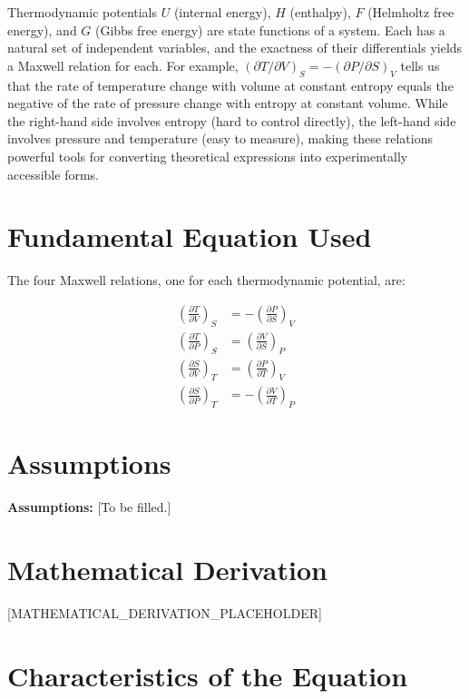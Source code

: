 \documentclass[11pt,openright]{book}
\begin{document}
Thermodynamic potentials $U$ (internal energy), $H$ (enthalpy), $F$ (Helmholtz free energy), and $G$ (Gibbs free energy) are state functions of a system. Each has a natural set of independent variables, and the exactness of their differentials yields a Maxwell relation for each. For example, $(\partial T/\partial V)_{S} = -(\partial P/\partial S)_{V}$ tells us that the rate of temperature change with volume at constant entropy equals the negative of the rate of pressure change with entropy at constant volume. While the right-hand side involves entropy (hard to control directly), the left-hand side involves pressure and temperature (easy to measure), making these relations powerful tools for converting theoretical expressions into experimentally accessible forms.
\section*{Fundamental Equation Used}

The four Maxwell relations, one for each thermodynamic potential, are:

\begin{align}
\left(\frac{\partial T}{\partial V}\right)_{S} &= -\left(\frac{\partial P}{\partial S}\right)_{V}
\label{eq:maxwell1} \\
\left(\frac{\partial T}{\partial P}\right)_{S} &= \left(\frac{\partial V}{\partial S}\right)_{P}
\label{eq:maxwell2} \\
\left(\frac{\partial S}{\partial V}\right)_{T} &= \left(\frac{\partial P}{\partial T}\right)_{V}
\label{eq:maxwell3} \\
\left(\frac{\partial S}{\partial P}\right)_{T} &= -\left(\frac{\partial V}{\partial T}\right)_{P}
\label{eq:maxwell4}
\end{align}
\section*{Assumptions}

\textbf{Assumptions:} [To be filled.]

\section*{Mathematical Derivation}

[MATHEMATICAL_DERIVATION_PLACEHOLDER]

\section*{Characteristics of the Equation}
\end{document}
